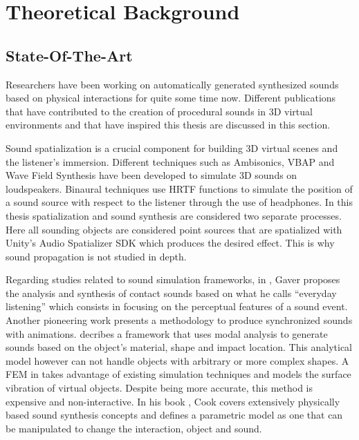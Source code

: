\chapter{Theoretical Background}\label{ch:theory}

\section{State-Of-The-Art}\label{sec:state_art}





Researchers have been working on automatically generated synthesized sounds based on physical interactions for quite some time now. Different publications that have contributed to the creation of procedural sounds in 3D virtual environments and that have inspired this thesis are discussed in this section.

Sound spatialization is a crucial component for building 3D virtual scenes and the listener's immersion. Different techniques such as Ambisonics, VBAP and Wave Field Synthesis have been developed to simulate 3D sounds on loudspeakers. Binaural techniques use \gls{HRTF} functions to simulate the position of a sound source with respect to the listener through the use of headphones. In this thesis spatialization and sound synthesis are considered two separate processes. Here all sounding objects are considered point sources that are spatialized with Unity\textsuperscript{\textregistered}'s Audio Spatializer \gls{SDK} \cite{bib:unity_doc} which produces the desired effect. This is why sound propagation is not studied in depth. 

Regarding studies related to sound simulation frameworks, in \cite{gaver1993we, gaver1993world}, Gaver proposes the analysis and synthesis of contact sounds based on what he calls ``everyday listening'' which consists in focusing on the perceptual features of a sound event. Another pioneering work \cite{takala1992sound} presents a methodology to produce synchronized sounds with animations. \cite{van1998sounds} decribes a framework that uses modal analysis to generate sounds based on the object's material, shape and impact location. This analytical model however can not handle objects with arbitrary or more complex shapes. A \gls{FEM} in \cite{director2001synthesizing} takes advantage of existing simulation techniques and models the surface vibration of virtual objects. Despite being more accurate, this method is expensive and non-interactive. In his book \cite{Cook:2002:RSS:515316}, Cook covers extensively physically based sound synthesis concepts and defines a parametric model as one that can be manipulated to change the interaction, object and sound.  

